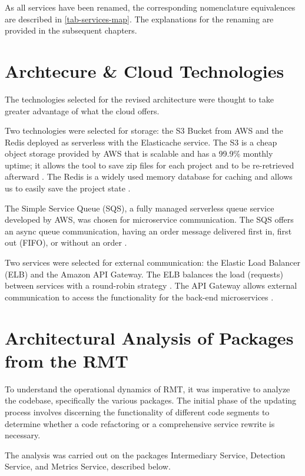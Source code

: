 As all services have been renamed, the corresponding nomenclature equivalences are described in \cref{tab-services-map}. The explanations for the renaming are provided in the subsequent chapters.



\section{Archtecure \& Cloud Technologies}
\label{sec-arch-cloud}

The technologies selected for the revised architecture were thought to take greater advantage of what the cloud offers. 

Two technologies were selected for storage: the S3 Bucket from AWS and the Redis deployed as serverless with the Elasticache service. The S3 is a cheap object storage provided by AWS that is scalable and has a 99.9\% monthly uptime; it allows the tool to save zip files for each project and to be re-retrieved afterward \cite{S3}. The Redis is a widely used memory database for caching and allows us to easily save the project state \cite{Redis}.

The Simple Service Queue (SQS), a fully managed serverless queue service developed by AWS, was chosen for microservice communication. The SQS offers an async queue communication, having an order message delivered first in, first out (FIFO), or without an order \cite{sqs}.

Two services were selected for external communication: the Elastic Load Balancer (ELB) and the Amazon API Gateway. The ELB balances the load (requests) between services with a round-robin strategy \cite{Elb}. The API Gateway allows external communication to access the functionality for the back-end microservices \cite{Gateway}.


\section{Architectural Analysis of Packages from the RMT}
\label{sec-archtectural-analysis}

To understand the operational dynamics of RMT, it was imperative to analyze the codebase, specifically the various packages. The initial phase of the updating process involves discerning the functionality of different code segments to determine whether a code refactoring or a comprehensive service rewrite is necessary.

The analysis was carried out on the packages Intermediary Service, Detection Service, and Metrics Service, described below.

